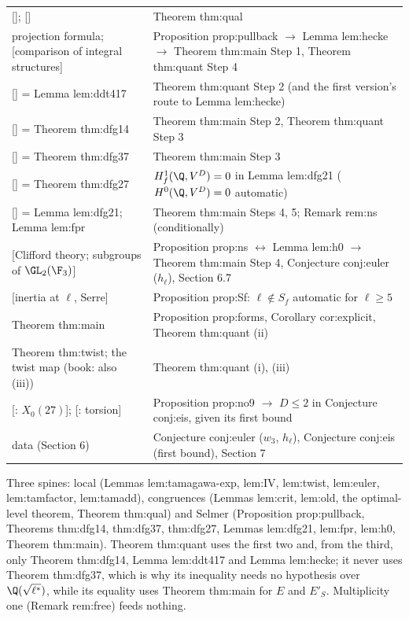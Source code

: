 \begin{sloppypar}
{\begin{longtable}{p{}p{}}
{[}\cite[Theorem 3.15]{DDT}]; [\cite[Theorem 2.2]{ARS12}] & Theorem thm:qual\\
projection formula; [comparison of integral structures] & Proposition prop:pullback $\to$ Lemma lem:hecke $\to$ Theorem thm:main Step 1, Theorem thm:quant Step 4\\
{[}\cite[Lemma 4.17]{DDT}] = Lemma lem:ddt417 & Theorem thm:quant Step 2 (and the first version's route to Lemma lem:hecke)\\
{[}\cite[Proposition 1.4(c)]{DFG04}] = Theorem thm:dfg14 & Theorem thm:main Step 2, Theorem thm:quant Step 3\\
{[}\cite[Theorem 3.7]{DFG04}] = Theorem thm:dfg37 & Theorem thm:main Step 3\\
{[}\cite[Theorem 2.7]{DFG04}] = Theorem thm:dfg27 & $H^1_f(\Q,V^D)=0$ in Lemma lem:dfg21 ($H^0(\Q,V^D)=0$ automatic)\\
{[}\cite[Lemma 2.1]{DFG04}] = Lemma lem:dfg21; Lemma lem:fpr & Theorem thm:main Steps 4, 5; Remark rem:ns (conditionally)\\
{[}Clifford theory; subgroups of $\GL_2(\F_3)$] & Proposition prop:ns $\leftrightarrow$ Lemma lem:h0 $\to$ Theorem thm:main Step 4, Conjecture conj:euler ($h_\ell$), Section 6.7\\
{[}inertia at $\ell$, Serre] & Proposition prop:Sf: $\ell\notin S_f$ automatic for $\ell\ge5$\\
Theorem thm:main & Proposition prop:forms, Corollary cor:explicit, Theorem thm:quant (ii)\\
Theorem thm:twist; the twist map (book: also (iii)) & Theorem thm:quant (i), (iii)\\
{[}\cite{Ligozat75}: $X_0(27)$]; [\cite{Mazur77}: torsion] & Proposition prop:no9 $\to$ $D\le2$ in Conjecture conj:eis, given its first bound\\
data (Section 6) & Conjecture conj:euler ($w_3$, $h_\ell$), Conjecture conj:eis (first bound), Section 7\\
\bottomrule
\end{longtable}}
Three spines: local (Lemmas lem:tamagawa-exp, lem:IV, lem:twist, lem:euler, lem:tamfactor, lem:tamadd), congruences (Lemmas lem:crit, lem:old, the optimal-level theorem,
Theorem thm:qual) and Selmer (Proposition prop:pullback, Theorems thm:dfg14, thm:dfg37, thm:dfg27, Lemmas lem:dfg21, lem:fpr, lem:h0, Theorem thm:main). Theorem thm:quant uses
the first two and, from the third, only Theorem thm:dfg14, Lemma lem:ddt417 and Lemma lem:hecke; it never uses Theorem thm:dfg37, which is why its inequality needs no
hypothesis over $\Q(\sqrt{\ell^*})$, while its equality uses Theorem thm:main for $E$ and $E'_S$. Multiplicity one (Remark rem:free) feeds nothing.


\end{sloppypar}
